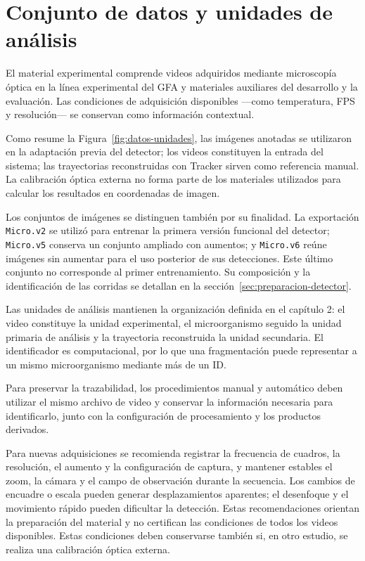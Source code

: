 \section{Conjunto de datos y unidades de análisis}

El material experimental comprende videos adquiridos mediante microscopía óptica en la línea experimental del GFA y materiales auxiliares del desarrollo y la evaluación. Las condiciones de adquisición disponibles —como temperatura, FPS y resolución— se conservan como información contextual.

Como resume la Figura~\ref{fig:datos-unidades}, las imágenes anotadas se utilizaron en la adaptación previa del detector; los videos constituyen la entrada del sistema; las trayectorias reconstruidas con Tracker sirven como referencia manual. La calibración óptica externa no forma parte de los materiales utilizados para calcular los resultados en coordenadas de imagen.

Los conjuntos de imágenes se distinguen también por su finalidad. La exportación \texttt{Micro.v2} se utilizó para entrenar la primera versión funcional del detector; \texttt{Micro.v5} conserva un conjunto ampliado con aumentos; y \texttt{Micro.v6} reúne imágenes sin aumentar para el uso posterior de sus detecciones. Este último conjunto no corresponde al primer entrenamiento. Su composición y la identificación de las corridas se detallan en la sección~\ref{sec:preparacion-detector}.

Las unidades de análisis mantienen la organización definida en el capítulo 2: el video constituye la unidad experimental, el microorganismo seguido la unidad primaria de análisis y la trayectoria reconstruida la unidad secundaria. El identificador es computacional, por lo que una fragmentación puede representar a un mismo microorganismo mediante más de un ID.

Para preservar la trazabilidad, los procedimientos manual y automático deben utilizar el mismo archivo de video y conservar la información necesaria para identificarlo, junto con la configuración de procesamiento y los productos derivados.

Para nuevas adquisiciones se recomienda registrar la frecuencia de cuadros, la resolución, el aumento y la configuración de captura, y mantener estables el zoom, la cámara y el campo de observación durante la secuencia. Los cambios de encuadre o escala pueden generar desplazamientos aparentes; el desenfoque y el movimiento rápido pueden dificultar la detección. Estas recomendaciones orientan la preparación del material y no certifican las condiciones de todos los videos disponibles. Estas condiciones deben conservarse también si, en otro estudio, se realiza una calibración óptica externa.


